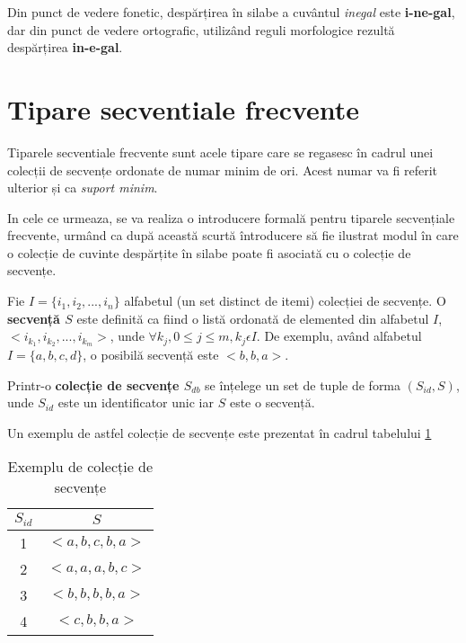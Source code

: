 \begin{ex}
Din punct de vedere fonetic, despărțirea în silabe a cuvântul \textit{inegal} este \textbf{i-ne-gal}, dar din punct de vedere ortografic, utilizând reguli morfologice rezultă despărțirea \textbf{in-e-gal}. 
\end{ex}

\section{Tipare secventiale frecvente}

Tiparele secventiale frecvente sunt acele tipare care se regasesc în cadrul unei colecții de secvențe ordonate de numar minim de ori. Acest numar va fi referit ulterior și ca \textit{suport minim}. 

In cele ce urmeaza, se va realiza o introducere formală pentru tiparele secvențiale frecvente, urmând ca după această scurtă întroducere să fie ilustrat modul în care o colecție de cuvinte despărțite în silabe poate fi asociată cu o colecție de secvențe.

\begin{defi}
Fie $I = \{i_1, i_2, ...,i_n\}$ alfabetul (un set distinct de itemi) colecției de secvențe. O \textbf{secvență $S$} este definită ca fiind o listă ordonată de elemented din alfabetul $I$, $<i_{k_1},i_{k_2}, ...,i_{k_m}>$, unde $\forall k_j, 0 \leq j \leq m, k_j \epsilon I$. 
De exemplu, având alfabetul $I=\{a,b,c,d\}$, o posibilă secvență este $<b,b,a>$.
\end{defi}

\begin{defi} 
Printr-o \textbf{colecție de secvențe $S_{db}$} se înțelege un set de tuple de forma $(S_{id}, S)$, unde $S_{id}$ este un identificator unic iar $S$ este o secvență. 
\end{defi}

\begin{ex}
Un exemplu de astfel colecție de secvențe este prezentat în cadrul tabelului \ref{table:sdb}
\end{ex}

\begin{table}[h]
\centering    
\begin{tabular}{|c|c|}    
\hline      
$S_{id}$ & $S$ \\
\hline                    
1 & $<a,b,c,b,a>$ \\
2 & $<a,a,a,b,c>$ \\
3 & $<b,b,b,b,a>$ \\
4 & $<c,b,b,a>$ \\
\hline                              
\end{tabular}
\caption{Exemplu de colecție de secvențe}
\label{table:sdb}               
\end{table}

